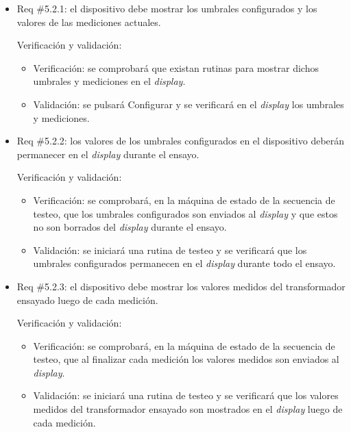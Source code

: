 \documentclass[11pt]{charter}
\begin{document}
\begin{itemize} 
\item Req \#5.2.1: el dispositivo debe mostrar los umbrales configurados y los valores de las mediciones actuales.

Verificación y validación:

\begin{itemize}
\item Verificación: se comprobará que existan rutinas para mostrar dichos umbrales y mediciones en el \textit{display}.
\item Validación: se pulsará Configurar y se verificará en el \textit{display} los umbrales y mediciones.
\end{itemize}

\end{itemize}

\begin{itemize} 
\item Req \#5.2.2: los valores de los umbrales configurados en el dispositivo deberán permanecer en el \textit{display} durante el ensayo.

Verificación y validación:

\begin{itemize}
\item Verificación: se comprobará, en la máquina de estado de la secuencia de testeo, que los umbrales configurados son enviados al \textit{display} y que estos no son borrados del \textit{display} durante el ensayo.
\item Validación: se iniciará una rutina de testeo y se verificará que los umbrales configurados permanecen en el \textit{display} durante todo el ensayo.  
\end{itemize}

\end{itemize}

\begin{itemize} 
\item Req \#5.2.3: el dispositivo debe mostrar los valores medidos del transformador ensayado luego de cada medición.

Verificación y validación:

\begin{itemize}
\item Verificación: se comprobará, en la máquina de estado de la secuencia de testeo, que al finalizar cada medición los valores medidos son enviados al \textit{display}.
\item Validación: se iniciará una rutina de testeo y se verificará que los valores medidos del transformador ensayado son mostrados en el \textit{display} luego de cada medición.   
\end{itemize}

\end{itemize}
\end{document}
